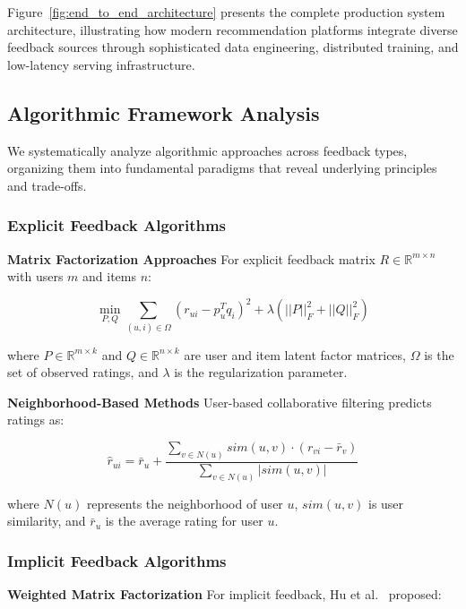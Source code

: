 Figure~\ref{fig:end_to_end_architecture} presents the complete production system architecture, illustrating how modern recommendation platforms integrate diverse feedback sources through sophisticated data engineering, distributed training, and low-latency serving infrastructure.

\subsection{Algorithmic Framework Analysis}

We systematically analyze algorithmic approaches across feedback types, organizing them into fundamental paradigms that reveal underlying principles and trade-offs.

\subsubsection{Explicit Feedback Algorithms}

\textbf{Matrix Factorization Approaches}
For explicit feedback matrix $R \in \mathbb{R}^{m \times n}$ with users $m$ and items $n$:

\begin{equation}
\min_{P,Q} \sum_{(u,i) \in \Omega} (r_{ui} - p_u^T q_i)^2 + \lambda(||P||_F^2 + ||Q||_F^2)
\end{equation}

where $P \in \mathbb{R}^{m \times k}$ and $Q \in \mathbb{R}^{n \times k}$ are user and item latent factor matrices, $\Omega$ is the set of observed ratings, and $\lambda$ is the regularization parameter.

\textbf{Neighborhood-Based Methods}
User-based collaborative filtering predicts ratings as:

\begin{equation}
\hat{r}_{ui} = \bar{r}_u + \frac{\sum_{v \in N(u)} sim(u,v) \cdot (r_{vi} - \bar{r}_v)}{\sum_{v \in N(u)} |sim(u,v)|}
\end{equation}

where $N(u)$ represents the neighborhood of user $u$, $sim(u,v)$ is user similarity, and $\bar{r}_u$ is the average rating for user $u$.

\subsubsection{Implicit Feedback Algorithms}

\textbf{Weighted Matrix Factorization}
For implicit feedback, Hu et al.~\cite{hu2008collaborative} proposed:

